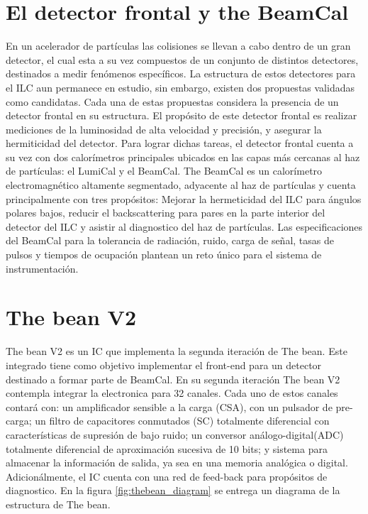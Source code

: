 \section{El detector frontal y the BeamCal}
	En un acelerador de partículas las colisiones se llevan a cabo dentro de un gran detector, el cual esta a su vez compuestos de un conjunto de distintos detectores, destinados a medir fenómenos específicos. La estructura de estos detectores para el ILC aun permanece en estudio, sin embargo, existen dos propuestas validadas como candidatas. Cada una de estas propuestas considera la presencia de un detector frontal en su estructura. El propósito de este detector frontal es realizar mediciones de la luminosidad de alta velocidad y precisión, y asegurar la hermiticidad del detector.
	Para lograr dichas tareas, el detector frontal cuenta a su vez con dos calorímetros principales ubicados en las capas más cercanas al haz de partículas: el LumiCal y el BeamCal.
The BeamCal es un calorímetro electromagnético altamente segmentado,  adyacente al haz de partículas y cuenta principalmente con tres propósitos: Mejorar la hermeticidad del ILC para ángulos polares bajos, reducir el backscattering para pares en la parte interior del detector del ILC y asistir al diagnostico del haz de partículas. Las especificaciones del BeamCal para la tolerancia de radiación, ruido, carga de señal, tasas de pulsos y tiempos de ocupación plantean un reto único para el sistema de instrumentación. 

\section{The bean V2}
The bean V2 es un IC que implementa la segunda iteración de The bean. Este integrado tiene como objetivo implementar el  front-end para un detector destinado a formar parte de BeamCal. En su segunda iteración The bean V2 contempla integrar la electronica para 32 canales. Cada uno de estos canales contará con: un amplificador sensible a la carga (CSA), con un pulsador de pre-carga; un filtro de capacitores conmutados (SC) totalmente diferencial con características de supresión de bajo ruido; un conversor análogo-digital(ADC) totalmente diferencial de aproximación sucesiva de 10 bits; y sistema para almacenar la información de salida, ya sea en una memoria analógica o digital. Adicionálmente, el IC cuenta con una red de feed-back para propósitos de diagnostico. En la figura \ref{fig:thebean_diagram} se entrega un diagrama de la estructura de The bean. 
  

